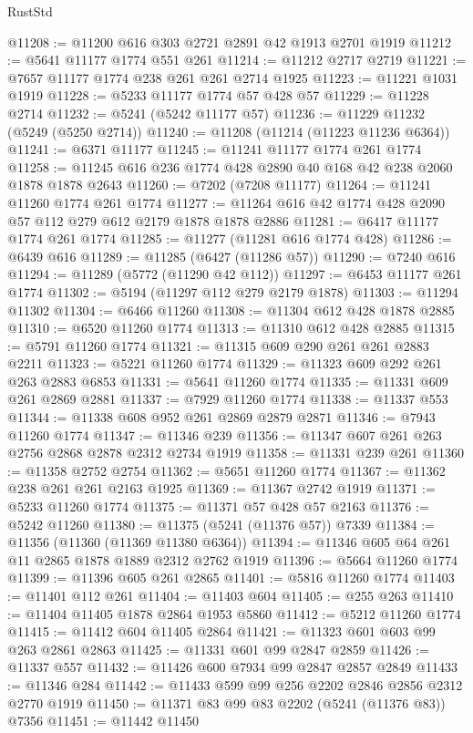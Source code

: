 \begin{lexlean}{RustStd}
\begin{coremodule}
{\begin{coremodule}
{{{{{{{{{{{{{{{{{{{{{{{{{{{{{@11208 := @11200 @616 @303 @2721 @2891 @42 @1913 @2701 @1919
@11212 := @5641 @11177 @1774 @551 @261
@11214 := @11212 @2717 @2719
@11221 := @7657 @11177 @1774 @238 @261 @261 @2714 @1925
@11223 := @11221 @1031 @1919
@11228 := @5233 @11177 @1774 @57 @428 @57
@11229 := @11228 @2714
@11232 := @5241 (@5242 @11177 @57)
@11236 := @11229 @11232 (@5249 (@5250 @2714))
@11240 := @11208 (@11214 (@11223 @11236 @6364))
@11241 := @6371 @11177
@11245 := @11241 @11177 @1774 @261 @1774
@11258 := @11245 @616 @236 @1774 @428 @2890 @40 @168 @42 @238 @2060 @1878 @1878 @2643
@11260 := @7202 (@7208 @11177)
@11264 := @11241 @11260 @1774 @261 @1774
@11277 := @11264 @616 @42 @1774 @428 @2090 @57 @112 @279 @612 @2179 @1878 @1878 @2886
@11281 := @6417 @11177 @1774 @261 @1774
@11285 := @11277 (@11281 @616 @1774 @428)
@11286 := @6439 @616
@11289 := @11285 (@6427 (@11286 @57))
@11290 := @7240 @616
@11294 := @11289 (@5772 (@11290 @42 @112))
@11297 := @6453 @11177 @261 @1774
@11302 := @5194 (@11297 @112 @279 @2179 @1878)
@11303 := @11294 @11302
@11304 := @6466 @11260
@11308 := @11304 @612 @428 @1878 @2885
@11310 := @6520 @11260 @1774
@11313 := @11310 @612 @428 @2885
@11315 := @5791 @11260 @1774
@11321 := @11315 @609 @290 @261 @261 @2883 @2211
@11323 := @5221 @11260 @1774
@11329 := @11323 @609 @292 @261 @263 @2883 @6853
@11331 := @5641 @11260 @1774
@11335 := @11331 @609 @261 @2869 @2881
@11337 := @7929 @11260 @1774
@11338 := @11337 @553
@11344 := @11338 @608 @952 @261 @2869 @2879 @2871
@11346 := @7943 @11260 @1774
@11347 := @11346 @239
@11356 := @11347 @607 @261 @263 @2756 @2868 @2878 @2312 @2734 @1919
@11358 := @11331 @239 @261
@11360 := @11358 @2752 @2754
@11362 := @5651 @11260 @1774
@11367 := @11362 @238 @261 @261 @2163 @1925
@11369 := @11367 @2742 @1919
@11371 := @5233 @11260 @1774
@11375 := @11371 @57 @428 @57 @2163
@11376 := @5242 @11260
@11380 := @11375 (@5241 (@11376 @57)) @7339
@11384 := @11356 (@11360 (@11369 @11380 @6364))
@11394 := @11346 @605 @64 @261 @11 @2865 @1878 @1889 @2312 @2762 @1919
@11396 := @5664 @11260 @1774
@11399 := @11396 @605 @261 @2865
@11401 := @5816 @11260 @1774
@11403 := @11401 @112 @261
@11404 := @11403 @604
@11405 := @255 @263
@11410 := @11404 @11405 @1878 @2864 @1953 @5860
@11412 := @5212 @11260 @1774
@11415 := @11412 @604 @11405 @2864
@11421 := @11323 @601 @603 @99 @263 @2861 @2863
@11425 := @11331 @601 @99 @2847 @2859
@11426 := @11337 @557
@11432 := @11426 @600 @7934 @99 @2847 @2857 @2849
@11433 := @11346 @284
@11442 := @11433 @599 @99 @256 @2202 @2846 @2856 @2312 @2770 @1919
@11450 := @11371 @83 @99 @83 @2202 (@5241 (@11376 @83)) @7356
@11451 := @11442 @11450
}}}}}}}}}}}}}}}}}}}}}}}}}}}}}
\end{coremodule}}
\end{coremodule}
\end{lexlean}
